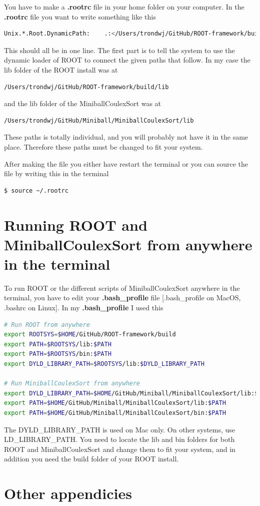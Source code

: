 \documentclass[twoside,english]{uiofysmaster/uiofysmaster}
\begin{document}
\begin{appendices}
You have to make a \textbf{.rootrc} file in your home folder on your computer. In the \textbf{.rootrc} file you want to write something like this 
\begin{lstlisting}[language=sh]
Unix.*.Root.DynamicPath:    .:</Users/trondwj/GitHub/ROOT-framework/build/lib>:/Users/trondwj/GitHub/Miniball/MiniballCoulexSort/lib:
\end{lstlisting}
This should all be in one line. The first part is to tell the system to use the dynamic loader of ROOT to connect the given paths that follow. In my case the lib folder of the ROOT install was at 
\begin{lstlisting}[language=sh]
/Users/trondwj/GitHub/ROOT-framework/build/lib
\end{lstlisting}
and the lib folder of the MiniballCoulexSort was at
\begin{lstlisting}[language=sh]
/Users/trondwj/GitHub/Miniball/MiniballCoulexSort/lib
\end{lstlisting}
These paths is totally individual, and you will probably not have it in the same place. Therefore these paths must be changed to fit your system. 

After making the file you either have restart the terminal or you can source the file by writing this in the terminal
\begin{lstlisting}[language=sh]
$ source ~/.rootrc
\end{lstlisting}


\chapter{Running ROOT and MiniballCoulexSort from anywhere in the terminal}
To run ROOT or the different scripts of MiniballCoulexSort anywhere in the terminal, you have to edit your \textbf{.bash\_profile} file [.bash\_profile on MacOS, .bashrc on Linux]. In my \textbf{.bash\_profile} I used this 
\begin{lstlisting}[language=sh]
# Run ROOT from anywhere
export ROOTSYS=$HOME/GitHub/ROOT-framework/build
export PATH=$ROOTSYS/lib:$PATH
export PATH=$ROOTSYS/bin:$PATH
export DYLD_LIBRARY_PATH=$ROOTSYS/lib:$DYLD_LIBRARY_PATH

# Run MiniballCoulexSort from anywhere
export DYLD_LIBRARY_PATH=$HOME/GitHub/Miniball/MiniballCoulexSort/lib:$DYLD_LIBRARY_PATH
export PATH=$HOME/GitHub/Miniball/MiniballCoulexSort/lib:$PATH
export PATH=$HOME/GitHub/Miniball/MiniballCoulexSort/bin:$PATH
\end{lstlisting}
The DYLD\_LIBRARY\_PATH is used on Mac only. On other systems, use \newline LD\_LIBRARY\_PATH. You need to locate the lib and bin folders for both ROOT and MiniballCoulexSort and change them to fit your system, and in addition you need the build folder of your ROOT install.


\chapter{Other appendicies}



\end{appendices}
\end{document}
